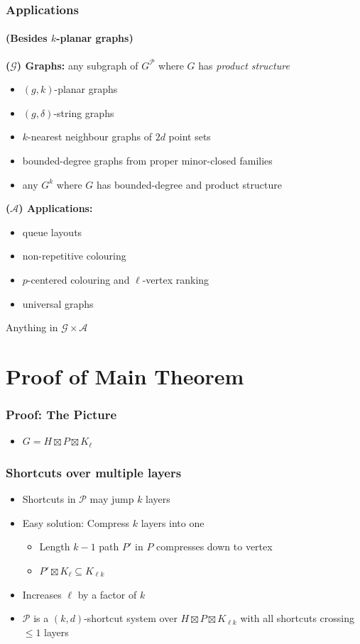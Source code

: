 \documentclass[xcolor=dvipsnames]{beamer}
\begin{document}
\begin{frame}
    \frametitle{Applications}
    \framesubtitle{(Besides $k$-planar graphs)}

    \textbf{($\mathcal{G}$) Graphs:} any subgraph of $G^\mathcal{P}$ where $G$ has \emph{product structure}
    \begin{itemize}
        \item $(g,k)$-planar graphs
        \item $(g,\delta)$-string graphs
        \item $k$-nearest neighbour graphs of $2d$ point sets
        \item bounded-degree graphs from proper minor-closed families
        \item any $G^k$ where $G$ has bounded-degree and product structure
    \end{itemize}

    \textbf{($\mathcal{A}$) Applications:}
    \begin{itemize}
        \item queue layouts
        \item non-repetitive colouring
        \item $p$-centered colouring and $\ell$-vertex ranking
        \item universal graphs
    \end{itemize}

    Anything in $\mathcal{G}\times \mathcal{A}$
\end{frame}

\section{Proof of Main Theorem}

\begin{frame}
  \frametitle{Proof: The Picture}
  \begin{itemize}
    \item $G= H\boxtimes P\boxtimes K_{\ell}$
  \end{itemize}
\end{frame}

\begin{frame}
  \frametitle{Shortcuts over multiple layers}
  
  \begin{itemize}
    \item Shortcuts in $\mathcal{P}$ may jump $k$ layers
    \item Easy solution: Compress $k$ layers into one
    \begin{itemize}
      \item Length $k-1$ path $P'$ in $P$ compresses down to vertex
      \item $P'\boxtimes K_{\ell}\subseteq K_{\ell k}$
    \end{itemize}
    \item Increases $\ell$ by a factor of $k$
    \item $\mathcal{P}$ is a $(k,d)$-shortcut system over $H\boxtimes P\boxtimes K_{\ell k}$ with all shortcuts crossing $\le\!\! 1$ layers
  \end{itemize}
\end{frame}
\end{document}
